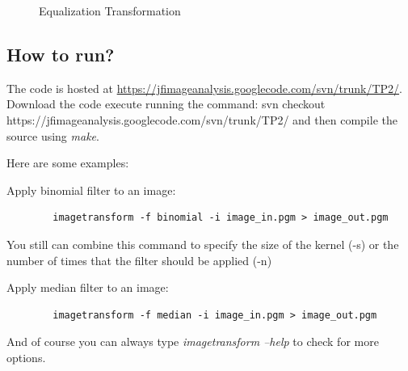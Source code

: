 \documentclass{article}
\begin{document}
	\begin{figure}[H]
	\centering
	\caption{Equalization Transformation}
	\label{fig:equalizing}
	\end{figure}

	
	\subsection{How to run?}
	The code is hosted at \url{https://jfimageanalysis.googlecode.com/svn/trunk/TP2/}. Download the code execute running the command: svn checkout https://jfimageanalysis.googlecode.com/svn/trunk/TP2/ and then compile the source using {\it make}.

	Here are some examples:
	
	Apply binomial filter to an image:
	\begin{lstlisting}	
		imagetransform -f binomial -i image_in.pgm > image_out.pgm
	\end{lstlisting}
	You still can combine this command to specify the size of the kernel (-s) or the number of times that the filter should be applied (-n)	
	
	Apply median filter to an image:
	\begin{lstlisting}	
		imagetransform -f median -i image_in.pgm > image_out.pgm
	\end{lstlisting}	

	And of course you can always type {\it imagetransform --help} to check for more options. 
\end{document}
